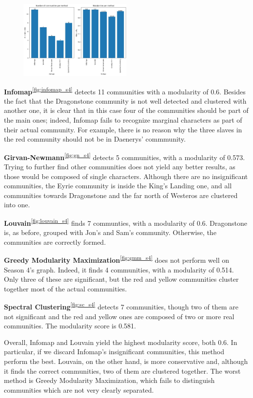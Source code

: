 \documentclass[10pt,twocolumn,letterpaper]{article}
\begin{document}
\begin{figure}[!h]
    \centering
    \includegraphics[width=0.5\textwidth]{img/s4/communities_comparison.jpg}
\end{figure}

\textbf{Infomap}\textsuperscript{\ref{fig:infomap_s4}} detects 11 communities with a modularity of 0.6. Besides the fact that the Dragonstone community is not well detected and clustered with another one, it is clear that in this case four of the communities should be part of the main ones; indeed, Infomap fails to recognize marginal characters as part of their actual community. For example, there is no reason why the three slaves in the red community should not be in Daenerys' commmunity. 

\textbf{Girvan-Newmann}\textsuperscript{\ref{fig:gn_s4}} detects 5 communities, with a modularity of 0.573. Trying to further find other communities does not yield any better results, as those would be composed of single characters. Although there are no insignificant communities, the Eyrie community is inside the King's Landing one, and all communities towards Dragonstone and the far north of Westeros are clustered into one.

\textbf{Louvain}\textsuperscript{\ref{fig:louvain_s4}} finds 7 communties, with a modularity of 0.6. Dragonstone is, as before, grouped with Jon's and Sam's community. Otherwise, the communities are correctly formed. 

\textbf{Greedy Modularity Maximization}\textsuperscript{\ref{fig:gmm_s4}} does not perform well on Season 4's graph. Indeed, it finds 4 communities, with a modularity of 0.514. Only three of these are significant, but the red and yellow communities cluster together most of the actual communities.

\textbf{Spectral Clustering}\textsuperscript{\ref{fig:sc_s4}} detects 7 communities, though two of them are not significant and the red and yellow ones are composed of two or more real communities. The modularity score is 0.581.

Overall, Infomap and Louvain yield the highest modularity score, both 0.6. In particular, if we discard Infomap's insignificant communities, this method perform the best. Louvain, on the other hand, is more conservative and, although it finds the correct communities, two of them are clustered together. The worst method is Greedy Modularity Maximization, which fails to distinguish communities which are not very clearly separated.
\end{document}
